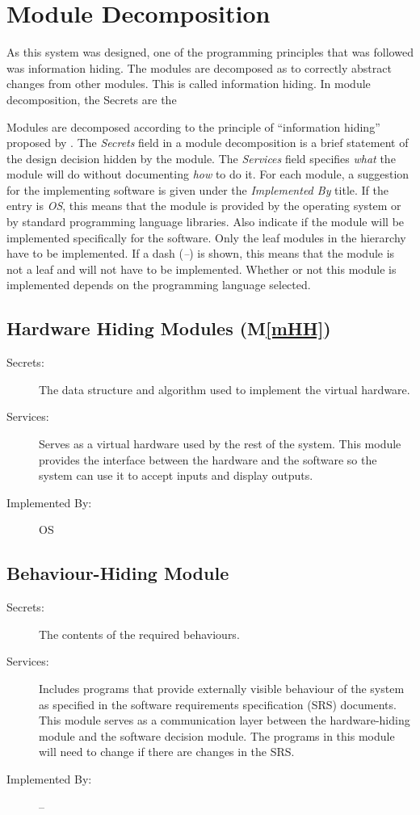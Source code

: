 \documentclass[12pt, titlepage]{article}
\newcommand{\mref}[1]{M\ref{#1}}
\begin{document}
\section{Module Decomposition} \label{SecMD}

	As this system was designed, one of the programming principles that was followed was information hiding. The modules are decomposed as to correctly abstract changes from other modules. This is called information hiding. In module decomposition, the Secrets are the 

Modules are decomposed according to the principle of ``information hiding''
proposed by \citet{ParnasEtAl1984}. The \emph{Secrets} field in a module
decomposition is a brief statement of the design decision hidden by the
module. The \emph{Services} field specifies \emph{what} the module will do
without documenting \emph{how} to do it. For each module, a suggestion for the
implementing software is given under the \emph{Implemented By} title. If the
entry is \emph{OS}, this means that the module is provided by the operating
system or by standard programming language libraries.  Also indicate if the
module will be implemented specifically for the software.
Only the leaf modules in the
hierarchy have to be implemented. If a dash (\emph{--}) is shown, this means
that the module is not a leaf and will not have to be implemented. Whether or
not this module is implemented depends on the programming language
selected.
\subsection{Hardware Hiding Modules (\mref{mHH})}
\begin{description}
\item[Secrets:]The data structure and algorithm used to implement the virtual
  hardware.
\item[Services:]Serves as a virtual hardware used by the rest of the
  system. This module provides the interface between the hardware and the
  software so the system can use it to accept inputs and display outputs.
\item[Implemented By:] OS
\end{description}
\subsection{Behaviour-Hiding Module}
\begin{description}
\item[Secrets:]The contents of the required behaviours.
\item[Services:]Includes programs that provide externally visible behaviour of
  the system as specified in the software requirements specification (SRS)
  documents. This module serves as a communication layer between the
  hardware-hiding module and the software decision module. The programs in this
  module will need to change if there are changes in the SRS.
\item[Implemented By:] --
\end{description}
\end{document}
